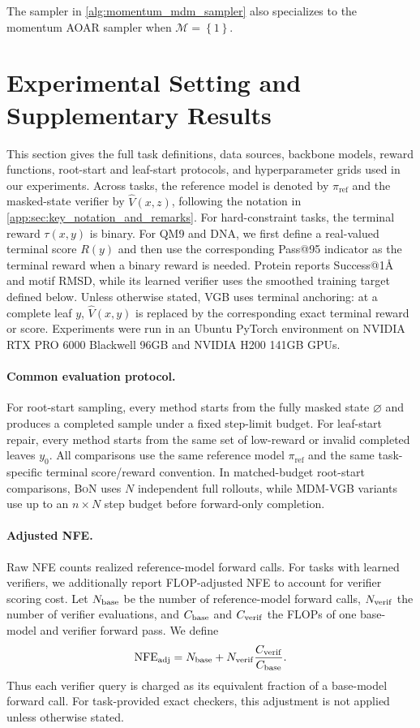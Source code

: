 \documentclass{article}
\numberwithin{theorem}{section}
\numberwithin{proposition}{section}
\numberwithin{corollary}{section}
\numberwithin{lemma}{section}
\numberwithin{conjecture}{section}
\numberwithin{remark}{section}
\numberwithin{definition}{section}
\numberwithin{assumption}{section}
\numberwithin{example}{section}
\newcommand{\calM}{{\mathcal{M}}}
\newcommand{\mbra}[1]{\left\{#1\right\}}
\providecommand{\base}{\pi_{\mathrm{ref}}}
\begin{document}
The sampler in \cref{alg:momentum_mdm_sampler} also specializes to the
momentum AOAR sampler when $\calM=\mbra{1}$.

\section{Experimental Setting and Supplementary Results}
\label{app:sec:experiment_settings_and_supplementary_results}
\label{app:exp_details}

This section gives the full task definitions, data sources, backbone models, reward functions, root-start and leaf-start protocols, and hyperparameter grids used in our experiments. Across tasks, the reference model is denoted by $\base$ and the masked-state verifier by $\widehat V(x,z)$, following the notation in \cref{app:sec:key_notation_and_remarks}. For hard-constraint tasks, the terminal reward $\tau(x,y)$ is binary. For QM9 and DNA, we first define a real-valued terminal score $R(y)$ and then use the corresponding Pass@95 indicator as the terminal reward when a binary reward is needed. Protein reports Success@1\AA{} and motif RMSD, while its learned verifier uses the smoothed training target defined below. Unless otherwise stated, VGB uses terminal anchoring: at a complete leaf $y$, $\widehat V(x,y)$ is replaced by the corresponding exact terminal reward or score. Experiments were run in an Ubuntu PyTorch environment on NVIDIA RTX PRO 6000 Blackwell 96GB and NVIDIA H200 141GB GPUs.

\paragraph{Common evaluation protocol.}
For root-start sampling, every method starts from the fully masked state
$\varnothing$ and produces a completed sample under a fixed step-limit
budget. For leaf-start repair, every method starts from the same set of low-reward or invalid completed leaves $y_0$. All comparisons use the same reference model $\base$ and the same task-specific terminal score/reward convention. In matched-budget root-start comparisons, \textsc{BoN} uses $N$ independent full rollouts, while MDM-VGB variants use up to an $n\times N$ step budget before forward-only completion.

\paragraph{Adjusted NFE.}
Raw NFE counts realized reference-model forward calls. For tasks with learned verifiers, we additionally report FLOP-adjusted NFE to account for verifier scoring cost. Let $N_{\rm base}$ be the number of reference-model forward calls, $N_{\rm verif}$ the number of verifier evaluations, and $C_{\rm base}$ and $C_{\rm verif}$ the FLOPs of one base-model and verifier forward pass. We define
\begin{equation*}
    \mathrm{NFE}_{\rm adj}
    =
    N_{\rm base}
    +
    N_{\rm verif}\frac{C_{\rm verif}}{C_{\rm base}}.
\end{equation*}
Thus each verifier query is charged as its equivalent fraction of a base-model forward call. For task-provided exact checkers, this adjustment is not applied unless otherwise stated.
\end{document}
